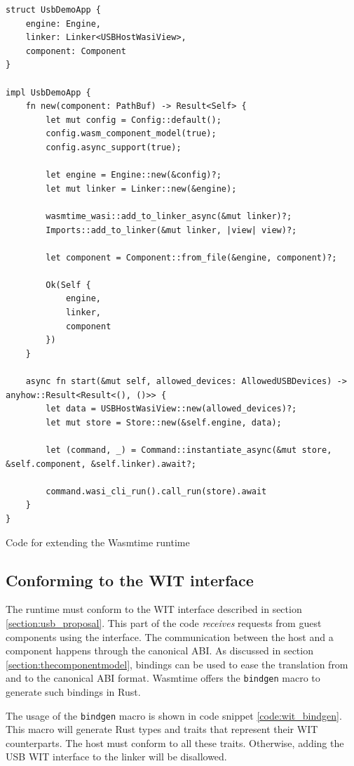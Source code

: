 \begin{code}
\begin{verbatim}
struct UsbDemoApp {
	engine: Engine,
	linker: Linker<USBHostWasiView>,
	component: Component
}

impl UsbDemoApp {
	fn new(component: PathBuf) -> Result<Self> {
		let mut config = Config::default();
		config.wasm_component_model(true);
		config.async_support(true);

		let engine = Engine::new(&config)?;
		let mut linker = Linker::new(&engine);

		wasmtime_wasi::add_to_linker_async(&mut linker)?;
		Imports::add_to_linker(&mut linker, |view| view)?;
		
		let component = Component::from_file(&engine, component)?;

		Ok(Self {
			engine,
			linker,
			component
		})
	}

	async fn start(&mut self, allowed_devices: AllowedUSBDevices) -> anyhow::Result<Result<(), ()>> {
		let data = USBHostWasiView::new(allowed_devices)?;
		let mut store = Store::new(&self.engine, data);
	
		let (command, _) = Command::instantiate_async(&mut store, &self.component, &self.linker).await?;
	
		command.wasi_cli_run().call_run(store).await
	}
}
\end{verbatim} 
\caption{Code for extending the Wasmtime runtime}
\label{code:start_component}
\end{code}

\subsection{Conforming to the \acrshort{WIT} interface}
The runtime must conform to the \acrshort{WIT} interface described in section \ref{section:usb_proposal}. This part of the code \textit{receives} requests from guest components using the interface. The communication between the host and a component happens through the canonical ABI. As discussed in section \ref{section:thecomponentmodel}, bindings can be used to ease the translation from and to the canonical ABI format. Wasmtime offers the \texttt{bindgen} macro \cite{wasmtime_component_bindgen} to generate such bindings in Rust.

The usage of the \texttt{bindgen} macro is shown in code snippet \ref{code:wit_bindgen}.
This macro will generate Rust types and traits that represent their \acrshort{WIT} counterparts. The host must conform to all these traits. Otherwise, adding the \acrshort{USB} \acrshort{WIT} interface to the linker will be disallowed.

